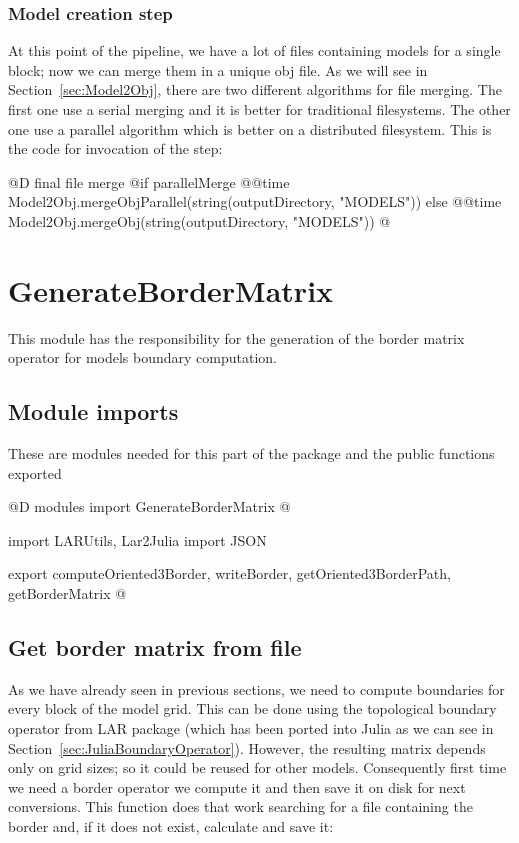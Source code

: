 \documentclass[11pt,oneside]{article}	%
\begin{document}
\subsubsection{Model creation step}\label{sec:mergeStep}

At this point of the pipeline, we have a lot of files containing models for a single block; now we can merge them in a unique obj file. As we will see in Section~\ref{sec:Model2Obj}, there are two different algorithms for file merging. The first one use a serial merging and it is better for traditional filesystems. The other one use a parallel algorithm which 
is better on a distributed filesystem. This is the code for invocation of the step:

@D final file merge
@{if parallelMerge
  @@time Model2Obj.mergeObjParallel(string(outputDirectory, "MODELS"))
else
  @@time Model2Obj.mergeObj(string(outputDirectory, "MODELS")) @}

\section{GenerateBorderMatrix}\label{sec:GenerateBorderMatrix}
This module has the responsibility for the generation of the border matrix operator for models boundary computation.

\subsection{Module imports}\label{sec:importsBorderMatrix}

These are modules needed for this part of the package and the public functions exported

@D modules import GenerateBorderMatrix
@{import LARUtils, Lar2Julia
import JSON

export computeOriented3Border, writeBorder, getOriented3BorderPath, getBorderMatrix
@}

\subsection{Get border matrix from file}\label{sec:getBorderMatrix}

As we have already seen in previous sections, we need to compute boundaries for every block of the model grid. This can be done using the topological boundary operator from LAR package (which has been ported into Julia as we can see in Section~\ref{sec:JuliaBoundaryOperator}). However, the resulting matrix depends only on grid sizes; so it could be reused for other models. Consequently first time we need a border operator we compute it and then save it on disk for next conversions. This function does that work searching for a file containing the border and, if it does not exist, calculate and save it: 
\end{document}
